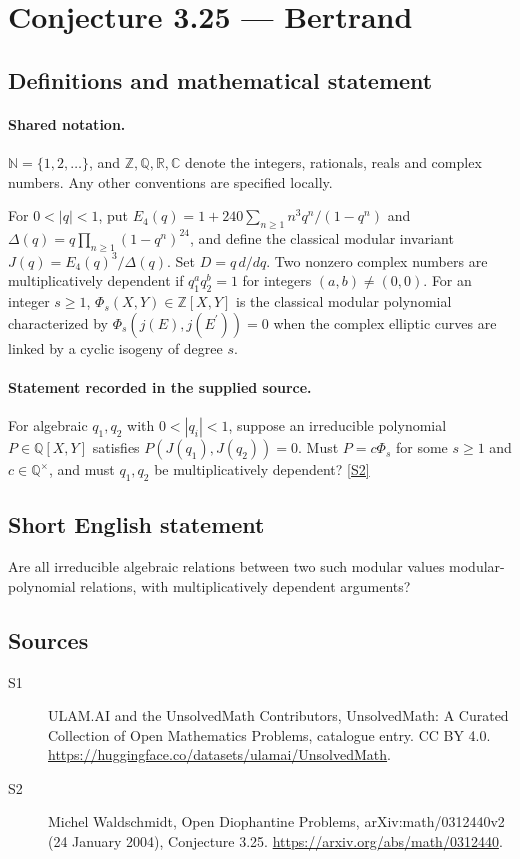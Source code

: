 \documentclass[11pt]{article}
\newcommand{\sref}[2]{\hyperlink{source:#1:#2}{[S#2]}}
\begin{document}
\section{Conjecture 3.25 — Bertrand}\label{statement}

\subsection{Definitions and mathematical statement}

\paragraph{Shared notation.}$\mathbb N=\{1,2,\ldots\}$, and $\mathbb Z,\mathbb Q,\mathbb R,\mathbb C$ denote the integers, rationals, reals and complex numbers. Any other conventions are specified locally.


For $0<|q|<1$, put $E_4(q)=1+240\sum_{n\ge1}n^3q^n/(1-q^n)$ and $\Delta(q)=q\prod_{n\ge1}(1-q^n)^{24}$, and define the classical modular invariant $J(q)=E_4(q)^3/\Delta(q)$. Set $D=q\,d/dq$. Two nonzero complex numbers are multiplicatively dependent if $q_1^a q_2^b=1$ for integers $(a,b)\ne(0,0)$. For an integer $s\ge1$, $\Phi_s(X,Y)\in\mathbb Z[X,Y]$ is the classical modular polynomial characterized by $\Phi_s(j(E),j(E^{\prime}))=0$ when the complex elliptic curves are linked by a cyclic isogeny of degree $s$.
\paragraph{Statement recorded in the supplied source.}
For algebraic $q_1,q_2$ with $0<|q_i|<1$, suppose an irreducible polynomial $P\in\mathbb Q[X,Y]$ satisfies $P(J(q_1),J(q_2))=0$. Must $P=c\Phi_s$ for some $s\ge1$ and $c\in\mathbb Q^\times$, and must $q_1,q_2$ be multiplicatively dependent? \sref{statement}{2}
\subsection{Short English statement}
Are all irreducible algebraic relations between two such modular values modular-polynomial relations, with multiplicatively dependent arguments?
\subsection{Sources}
\begin{description}
\item[\hypertarget{source:statement:1}{S1}] ULAM.AI and the UnsolvedMath Contributors, UnsolvedMath: A Curated Collection of Open Mathematics Problems, catalogue entry. CC BY 4.0. \url{https://huggingface.co/datasets/ulamai/UnsolvedMath}.
\item[\hypertarget{source:statement:2}{S2}] Michel Waldschmidt, Open Diophantine Problems, arXiv:math/0312440v2 (24 January 2004), Conjecture 3.25. \url{https://arxiv.org/abs/math/0312440}.
\end{description}
\label{end:statement}
\end{document}
